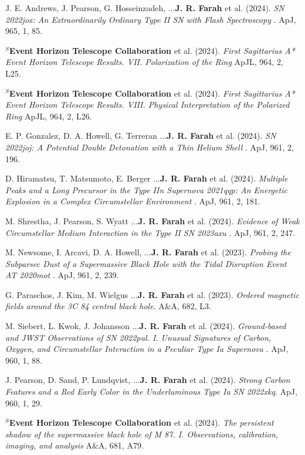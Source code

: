 \documentclass[margin,line]{res}
\begin{document}
\begin{resume}
J. E. Andrews, J. Pearson, G. Hosseinzadeh, ...\textbf{J. R. Farah} et al. (2024). \textit{ SN 2022jox: An Extraordinarily Ordinary Type II SN with Flash Spectroscopy }. ApJ, 965, 1, 85.


\textbf{$^S$Event Horizon Telescope Collaboration} et al. (2024). \textit{ First Sagittarius A* Event Horizon Telescope Results. VII. Polarization of the Ring } ApJL, 964, 2, L25.

\textbf{$^S$Event Horizon Telescope Collaboration} et al. (2024). \textit{ First Sagittarius A* Event Horizon Telescope Results. VIII. Physical Interpretation of the Polarized Ring } ApJL, 964, 2, L26.

E. P. Gonzalez, D. A. Howell, G. Terreran ...\textbf{J. R. Farah} et al. (2024). \textit{ SN 2022joj: A Potential Double Detonation with a Thin Helium Shell  }. ApJ, 961, 2, 196.

D. Hiramatsu, T. Matsumoto, E. Berger ...\textbf{J. R. Farah} et al. (2024). \textit{ Multiple Peaks and a Long Precursor in the Type IIn Supernova 2021qqp: An Energetic Explosion in a Complex Circumstellar Environment   }. ApJ, 961, 2, 181.

M. Shrestha, J. Pearson, S. Wyatt ...\textbf{J. R. Farah} et al. (2024). \textit{ Evidence of Weak Circumstellar Medium Interaction in the Type II SN 2023axu  }. ApJ, 961, 2, 247.

M. Newsome, I. Arcavi, D. A. Howell, ...\textbf{J. R. Farah} et al. (2023). \textit{ Probing the Subparsec Dust of a Supermassive Black Hole with the Tidal Disruption Event AT 2020mot }. ApJ, 961, 2, 239.

G. Paraschos, J. Kim, M. Wielgus ...\textbf{J. R. Farah} et al. (2023). \textit{ Ordered magnetic fields around the 3C 84 central black hole}. A\&A, 682, L3.

M. Siebert, L. Kwok, J. Johansson ...\textbf{J. R. Farah} et al. (2024). \textit{Ground-based and JWST Observations of SN 2022pul. I. Unusual Signatures of Carbon, Oxygen, and Circumstellar Interaction in a Peculiar Type Ia Supernova }. ApJ, 960, 1, 88.

J. Pearson, D. Sand, P. Lundqvist, ...\textbf{J. R. Farah} et al. (2024). \textit{Strong Carbon Features and a Red Early Color in the Underluminous Type Ia SN 2022xkq}. ApJ, 960, 1, 29.

\textbf{$^S$Event Horizon Telescope Collaboration} et al. (2024). \textit{The persistent shadow of the supermassive black hole of M 87. I. Observations, calibration, imaging, and analysis } A\&A, 681, A79.


\end{resume}
\end{document}
